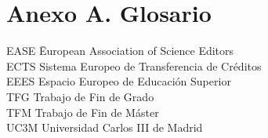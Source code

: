 \documentclass[12pt]{report} %
\begin{document}
\clearpage
{}
\printbibliography




\chapter* {Anexo A. Glosario}

\begin{tabbing}	
EASE \quad\=	European Association of Science Editors \\
ECTS \>	Sistema Europeo de Transferencia de Créditos \\
EEES \> Espacio Europeo de Educación Superior \\
TFG	\>	Trabajo de Fin de Grado \\
TFM	\>	Trabajo de Fin de Máster \\
UC3M \>	Universidad Carlos III de Madrid 
\end{tabbing}
\end{document}
